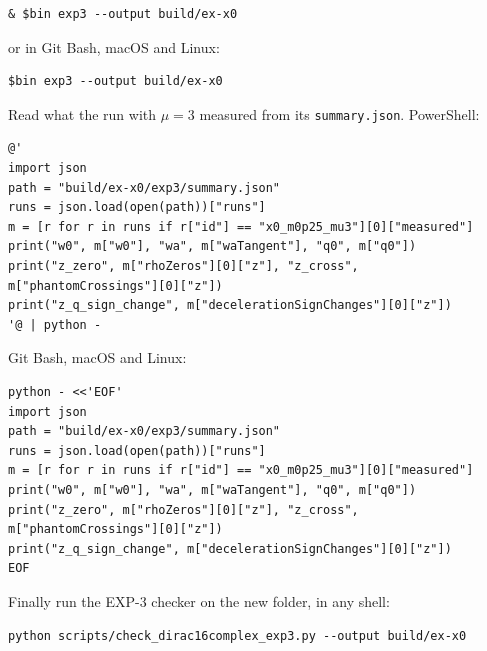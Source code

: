 \documentclass[11pt]{article}
\begin{document}
\begin{Verbatim}[fontsize=\small]
& $bin exp3 --output build/ex-x0
\end{Verbatim}

or in Git Bash, macOS and Linux:

\begin{Verbatim}[fontsize=\small]
$bin exp3 --output build/ex-x0
\end{Verbatim}

Read what the run with $\mu=3$ measured from its \texttt{summary.\allowbreak{}json}. PowerShell:

\begin{Verbatim}[fontsize=\small]
@'
import json
path = "build/ex-x0/exp3/summary.json"
runs = json.load(open(path))["runs"]
m = [r for r in runs if r["id"] == "x0_m0p25_mu3"][0]["measured"]
print("w0", m["w0"], "wa", m["waTangent"], "q0", m["q0"])
print("z_zero", m["rhoZeros"][0]["z"], "z_cross", m["phantomCrossings"][0]["z"])
print("z_q_sign_change", m["decelerationSignChanges"][0]["z"])
'@ | python -
\end{Verbatim}

Git Bash, macOS and Linux:

\begin{Verbatim}[fontsize=\small]
python - <<'EOF'
import json
path = "build/ex-x0/exp3/summary.json"
runs = json.load(open(path))["runs"]
m = [r for r in runs if r["id"] == "x0_m0p25_mu3"][0]["measured"]
print("w0", m["w0"], "wa", m["waTangent"], "q0", m["q0"])
print("z_zero", m["rhoZeros"][0]["z"], "z_cross", m["phantomCrossings"][0]["z"])
print("z_q_sign_change", m["decelerationSignChanges"][0]["z"])
EOF
\end{Verbatim}

Finally run the EXP-3 checker on the new folder, in any shell:

\begin{Verbatim}[fontsize=\small]
python scripts/check_dirac16complex_exp3.py --output build/ex-x0
\end{Verbatim}
\end{document}
